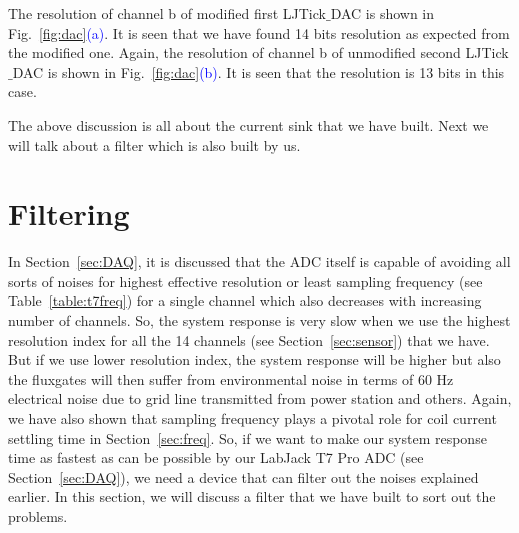 The resolution of channel b of modified first LJTick$\_$DAC is shown in Fig.~\ref{fig:dac}\textcolor{blue}{(a)}. It is seen that we have found 14 bits resolution as expected from the modified one. Again, the resolution of channel b of unmodified second LJTick$\_$DAC is shown in Fig.~\ref{fig:dac}\textcolor{blue}{(b)}. It is seen that the resolution is 13 bits in this case.


The above discussion is all about the current sink that we have built. Next we will talk about a filter which is also built by us.





\section{Filtering}\label{sec:filter}
In Section~\ref{sec:DAQ}, it is discussed that the ADC itself is capable of avoiding all sorts of noises for highest effective resolution or least sampling frequency (see Table~\ref{table:t7freq}) for a single channel which also decreases with increasing number of channels. So, the system response is very slow when we use the highest resolution index for all the 14 channels (see Section~\ref{sec:sensor}) that we have. But if we use lower resolution index, the system response will be higher but also the fluxgates will then suffer from environmental noise in terms of 60 Hz electrical noise due to grid line transmitted from power station and others. Again, we have also shown that sampling frequency plays a pivotal role for coil current settling time in Section~\ref{sec:freq}. So, if we want to make our system response time as fastest as can be possible by our LabJack T7 Pro ADC (see Section~\ref{sec:DAQ}), we need a device that can filter out the noises explained earlier. In this section, we will discuss a filter that we have built to sort out the problems.


